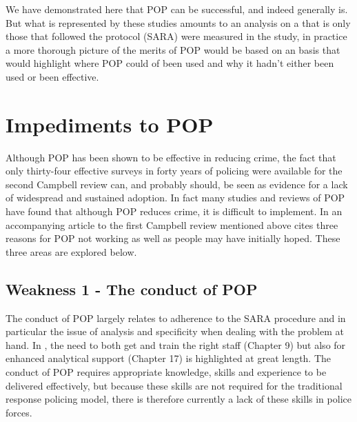 We have demonstrated here that POP can be successful, and indeed generally is. But what is represented by these studies amounts to an analysis on a  that is only those that followed the protocol (SARA) were measured in the study, in practice a more thorough picture of the merits of POP would be based on an  basis that would highlight where POP could of been used and why it hadn't either been used or been effective.



\section{Impediments to POP} 



Although POP has been shown to be effective in reducing crime, the fact that only thirty-four effective surveys in forty years of policing were available for the second Campbell review can, and probably should, be seen as evidence for a lack of widespread and sustained adoption. In fact many studies and reviews of POP have found that although POP reduces crime, it is difficult to implement. In an accompanying article to the first Campbell review mentioned above \textcite{whitherpop} cites three reasons for POP not working as well as people may have initially hoped. These three areas are explored below.



\subsection{Weakness 1 - The conduct of POP}  



The conduct of POP largely relates to adherence to the SARA procedure and in particular the issue of analysis and specificity when dealing with the problem at hand. In \textcite{scott2012implementing} , the need to both get and train the right staff (Chapter 9) but also for enhanced analytical support (Chapter 17) is highlighted at great length. The conduct of POP requires appropriate  knowledge, skills and experience to be delivered effectively, but because these skills are not required for the traditional response policing model, there is therefore currently a lack of these skills in police forces. 

